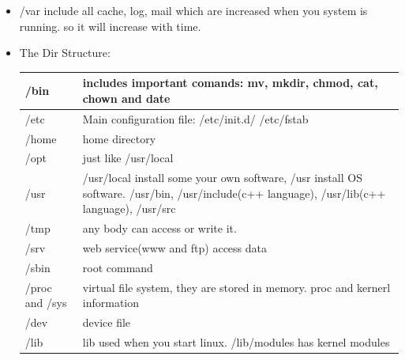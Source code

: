 \documentclass[a4paper,11pt,twoside]{book}
\begin{document}
\begin{itemize}
         \item /var include all cache, log, mail which are increased when you system is running. so it will increase with time. 
         
		 \item The Dir Structure:
\begin{center}
\begin{tabular}{p{}|p{}}
  \hline
  /bin & includes important comands: mv, mkdir, chmod, cat, chown and date  \\
 \hline  /etc & Main configuration file: /etc/init.d/ /etc/fstab \\
  \hline /home & home directory \\
  \hline /opt & just like /usr/local  \\
  \hline /usr & /usr/local install some your own software, /usr install OS software.  /usr/bin, /usr/include(c++ language), /usr/lib(c++ language),  /usr/src \\
  \hline /tmp & any body can access or write it.     \\
  \hline /srv & web service(www and ftp) access data \\
  \hline /sbin & root command \\
  \hline /proc and /sys & virtual file system, they are stored in memory.  proc and kernerl information \\
  \hline /dev & device file \\
  \hline /lib & lib used when you start linux. /lib/modules has kernel modules \\
  \hline 
\end{tabular} 
 \end{center}
\end{itemize} 
\end{document}
